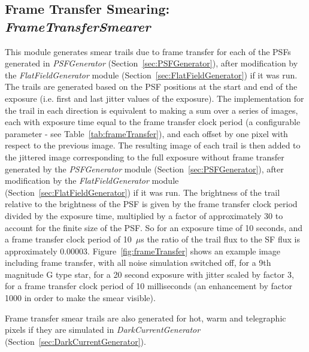 \documentclass[11pt]{article}      %
\def\HCode#1{}
\def\htmlanchor#1{\HCode{<a id="#1"></a>}}
\begin{document}
\clearpage

\htmlanchor{FrameTransferSmearer}
\subsection{Frame Transfer Smearing:  {\it FrameTransferSmearer}}
\label{sec:FrameTransferSmearer}

This module generates smear trails due to frame transfer for each of the PSFs generated in {\it PSFGenerator} (Section~\ref{sec:PSFGenerator}), after modification by the {\it FlatFieldGenerator} module (Section~\ref{sec:FlatFieldGenerator}) if it was run.  The trails are generated based on the PSF positions at the start and end of the exposure (i.e. first and last jitter values of the exposure).  The implementation for the trail in each direction is equivalent to making a sum over a series of images, each with exposure time equal to the frame transfer clock period (a configurable parameter - see Table~\ref{tab:frameTransfer}), and each offset by one pixel with respect to the previous image.  The resulting image of each trail is then added to the jittered image corresponding to the full exposure without frame transfer generated by the {\it PSFGenerator} module (Section~\ref{sec:PSFGenerator}), after modification by the {\it FlatFieldGenerator} module (Section~\ref{sec:FlatFieldGenerator}) if it was run.  The brightness of the trail relative to the brightness of the PSF is given by the frame transfer clock period divided by the exposure time, multiplied by a factor of approximately 30 to account for the finite size of the PSF.  So for an exposure time of 10 seconds, and a frame transfer clock period of 10~$\mu$s the ratio of the trail flux to the SF flux is approximately 0.00003.  Figure~\ref{fig:frameTransfer} shows an example image including frame transfer, with all noise simulation switched off, for a 9th magnitude G type star, for a 20 second exposure with jitter scaled by factor 3, for a frame transfer clock period of 10 milliseconds (an enhancement by factor 1000 in order to make the smear visible).

Frame transfer smear trails are also generated for hot, warm and telegraphic pixels if they are simulated in {\em DarkCurrentGenerator} (Section~\ref{sec:DarkCurrentGenerator}).
\end{document}
